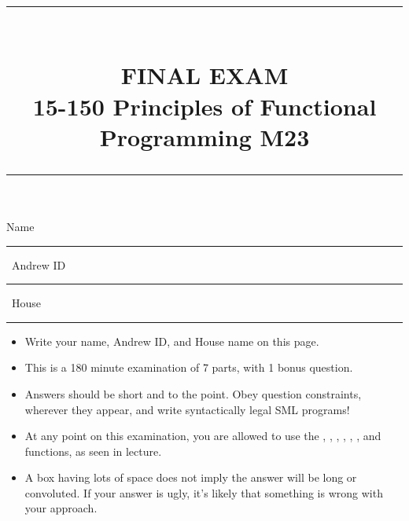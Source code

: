 \documentclass[addpoints,12pt, answers]{exam}
\newcommand{\HRule}[1]{\rule{\linewidth}{#1}}
\begin{document}
\pagestyle{fancy}
\fancyhead{} %
\fancyfoot[C]{\thepage} %


\setlength{\droptitle}{-8em}   %

\title{ \normalsize \textsc{}
		\HRule{1.5pt} \\
		\large \textbf{
      \uppercase{Final Exam} \\
      15-150 Principles of Functional Programming M23} \\
    \HRule{1.5pt}
    \date{}
}

\maketitle

\vspace{-3cm}

\hspace{-1cm} Name \rule{5cm}{0.4pt} \, Andrew ID \rule{3cm}{0.4pt} \, House \rule{3.5cm}{0.4pt}

\vspace{5pt}

\begin{itemize}
  \item Write your name, Andrew ID, and House name on this page.
  \vspace{-5pt}
  \item This is a 180 minute examination of 7 parts, with 1 bonus question.
  \vspace{-5pt}
  \item Answers should be short and to the point. Obey question constraints, wherever
  they appear, and write syntactically legal SML programs!
  \vspace{-5pt}
  \item At any point on this examination, you are allowed to use the ,
  , , , , , and  functions,
  as seen in lecture.
  \vspace{-5pt}
  \item A box having lots of space does not imply the answer will be long or convoluted. If your
  answer is ugly, it's likely that something is wrong with your approach.
\end{itemize}
\vspace{\fill}
\end{document}
